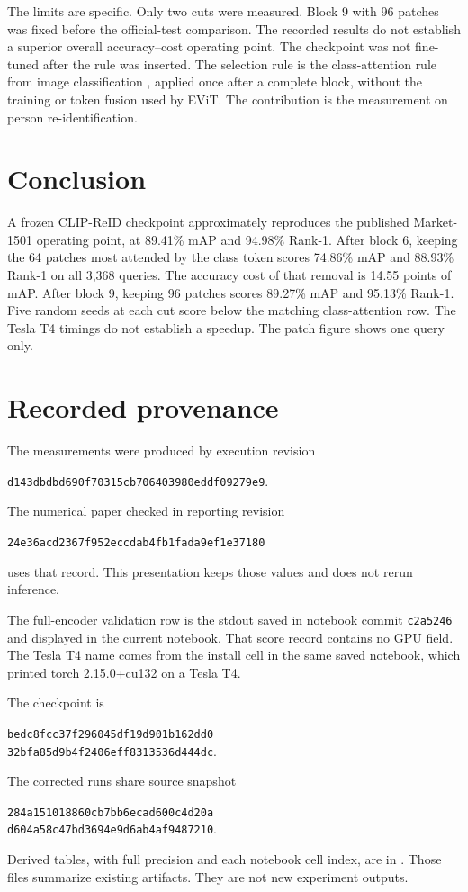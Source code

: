 \documentclass[11pt]{article}
\begin{document}
The limits are specific.
Only two cuts were measured.
Block 9 with 96 patches was fixed before the official-test comparison.
The recorded results do not establish a superior overall accuracy--cost operating point.
The checkpoint was not fine-tuned after the rule was inserted.
The selection rule is the class-attention rule from image classification \cite{liang2022evit}, applied once after a complete block, without the training or token fusion used by EViT.
The contribution is the measurement on person re-identification.

\section{Conclusion}
A frozen CLIP-ReID checkpoint approximately reproduces the published Market-1501 operating point, at 89.41\% mAP and 94.98\% Rank-1.
After block 6, keeping the 64 patches most attended by the class token scores 74.86\% mAP and 88.93\% Rank-1 on all 3{,}368 queries.
The accuracy cost of that removal is 14.55 points of mAP.
After block 9, keeping 96 patches scores 89.27\% mAP and 95.13\% Rank-1.
Five random seeds at each cut score below the matching class-attention row.
The Tesla T4 timings do not establish a speedup.
The patch figure shows one query only.

\appendix
\section{Recorded provenance}
\label{app:prov}
The measurements were produced by execution revision
\begin{center}
\small\texttt{d143dbdbd690f70315cb706403980eddf09279e9}.
\end{center}
The numerical paper checked in reporting revision
\begin{center}
\small\texttt{24e36acd2367f952eccdab4fb1fada9ef1e37180}
\end{center}
uses that record.
This presentation keeps those values and does not rerun inference.

The full-encoder validation row is the stdout saved in notebook commit \texttt{c2a5246} and displayed in the current notebook.
That score record contains no GPU field.
The Tesla T4 name comes from the install cell in the same saved notebook, which printed torch 2.15.0+cu132 on a Tesla T4.

The checkpoint is
\begin{center}
\small\texttt{bedc8fcc37f296045df19d901b162dd0}\\
\texttt{32bfa85d9b4f2406eff8313536d444dc}.
\end{center}
The corrected runs share source snapshot
\begin{center}
\small\texttt{284a151018860cb7bb6ecad600c4d20a}\\
\texttt{d604a58c47bd3694e9d6ab4af9487210}.
\end{center}
Derived tables, with full precision and each notebook cell index, are in .
Those files summarize existing artifacts.
They are not new experiment outputs.



\end{document}
